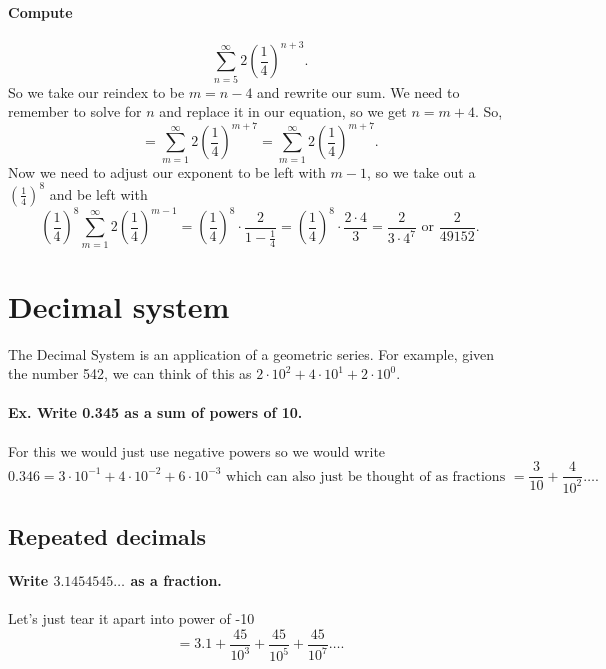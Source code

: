 \paragraph{Compute}
\[
\sum_{ n=5 } ^{ \infty } 2\left( \frac{ 1 }{ 4 }  \right) ^{ n+3 }
.\] 
So we take our reindex to be $ m=n-4 $ and rewrite our sum. We need to remember to solve for $ n $ and replace it in our equation, so we get $ n=m+4 $. So,
\[
=\sum_{ m=1 } ^{ \infty } 2\left( \frac{ 1 }{ 4 }  \right) ^{ m+7 }=\sum_{ m=1 } ^{ \infty } 2\left( \frac{ 1 }{ 4 }  \right) ^{ m+7 }
.\] 
Now we need to adjust our exponent to be left with $ m-1 $, so we take out a $ \left( \frac{ 1 }{ 4 }  \right) ^{ 8 } $ and be left with 
\[
	\left( \frac{ 1 }{ 4 }  \right) ^{ 8 }\sum_{ m=1 } ^{ \infty } 2\left( \frac{ 1 }{ 4 }  \right) ^{ m-1 }=\left( \frac{ 1 }{ 4 }  \right) ^{ 8 }\cdot \frac{ 2 }{ 1-\frac{ 1 }{ 4 }  } = \left( \frac{ 1 }{ 4 }  \right) ^{ 8 }\cdot \frac{ 2\cdot 4 }{ 3 }=\frac{ 2 }{ 3\cdot 4^{ 7 } } \text{ or }\frac{ 2 }{ 49152 } 
.\] 

\section{Decimal system}%
\label{sec:Decimal system}
The Decimal System is an application of a geometric series. For example, given the number 542, we can think of this as $ 2\cdot 10^{ 2 }+4\cdot 10^{ 1 }+2\cdot 10^{ 0 } $.

\paragraph{Ex. Write 0.345 as a sum of powers of 10. }

For this we would just use negative powers so we would write 
\[
0.346 = 3\cdot 10^{ -1 }+4\cdot 10^{ -2 }+6 \cdot 10^{ -3 } \text{ which can also just be thought of as fractions }= \frac{ 3 }{ 10 } +\frac{ 4 }{ 10^2 } \ldots
.\] 

\subsection{Repeated decimals}%
\label{sub:Repeated decimals}
\paragraph{Write $ 3.1454545\ldots $ as a fraction. }
Let's just tear it apart into power of -10
\[
=3.1 + \frac{ 45 }{ 10^{ 3 } } +\frac{ 45 }{ 10^{ 5 } } +\frac{ 45 }{ 10^{ 7 } } \ldots
.\] 

